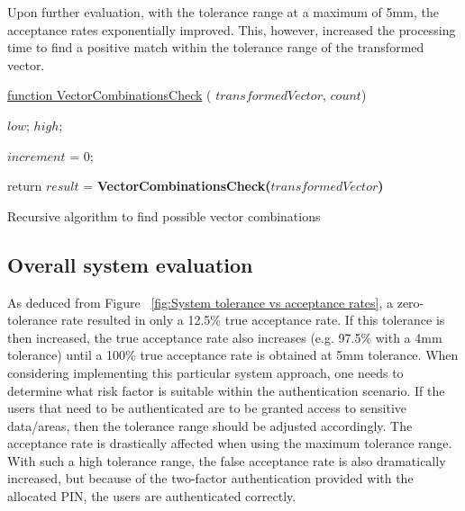 Upon further evaluation, with the tolerance range at a maximum of 5mm, the acceptance rates exponentially improved. This, however, increased the processing time to find a positive match within the tolerance range of the transformed vector. 


\begin{algorithm}
     
     \underline{function VectorCombinationsCheck} ( $transformedVector$, $count$)\;
     
      $low$;
      $high$;
     
     $increment$ = 0;
     
     
     
     return $result$ = \textbf{VectorCombinationsCheck($transformedVector$)}
     
     
     \caption{Recursive algorithm to find possible vector combinations}
\end{algorithm}


\subsection{Overall system evaluation}

As deduced from Figure ~\ref{fig:System tolerance vs acceptance rates}, a zero-tolerance rate resulted in only a 12.5\% true acceptance rate. If this tolerance is then increased, the true acceptance rate also increases (e.g. 97.5\% with a 4mm tolerance) until a 100\% true acceptance rate is obtained at 5mm tolerance. 
When considering implementing this particular system approach, one needs to determine what risk factor is suitable within the authentication scenario. If the users that need to be authenticated are to be granted access to sensitive data/areas, then the tolerance range should be adjusted accordingly. The acceptance rate is drastically affected when using the maximum tolerance range. With such a high tolerance range, the false acceptance rate is also dramatically increased, but because of the two-factor authentication provided with the allocated PIN, the users are authenticated correctly.


